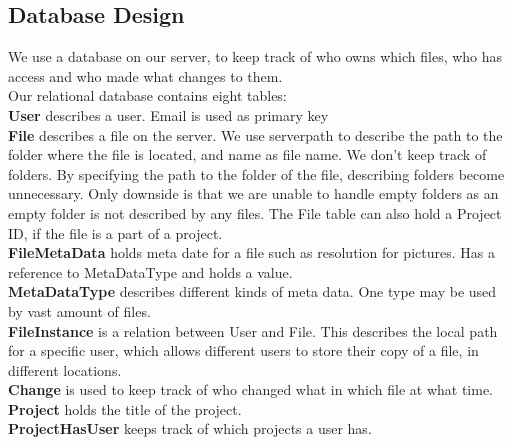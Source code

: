 \subsection{Database Design}
We use a database on our server, to keep track of who owns which files, who has access and who made what changes to them.\\
Our relational database contains eight tables:\\
\textbf{User} describes a user. Email is used as primary key\\
\textbf{File} describes a file on the server. We use serverpath to describe the path to the folder where the file is located, and name as file name. We don't keep track of folders. By specifying the path to the folder of the file, describing folders become unnecessary. Only downside is that we are unable to handle empty folders as an empty folder is not described by any files. The File table can also hold a Project ID, if the file is a part of a project.\\
\textbf{FileMetaData} holds meta date for a file such as resolution for pictures. Has a reference to MetaDataType and holds a value.\\
\textbf{MetaDataType} describes different kinds of meta data. One type may be used by vast amount of files.\\
\textbf{FileInstance} is a relation between User and File. This describes the local path for a specific user, which allows different users to store their copy of a file, in different locations.\\
\textbf{Change} is used to keep track of who changed what in which file at what time.\\
\textbf{Project} holds the title of the project.\\
\textbf{ProjectHasUser} keeps track of which projects a user has.\\